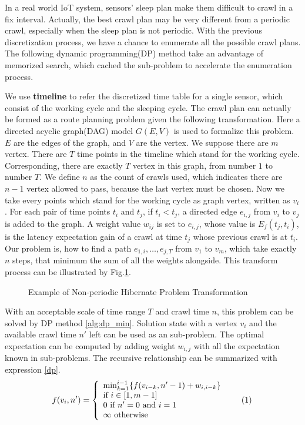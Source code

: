 \documentclass[conference]{IEEEtran}
\newcommand\numberthis{\addtocounter{equation}{1}\tag{\theequation}}
\begin{document}
In a real world IoT system, sensors' sleep plan make them difficult to crawl in a fix interval. 
Actually, the best crawl plan may be very different from a periodic crawl, especially when the sleep plan is not periodic.
With the previous discretization process, we have a chance to enumerate all the possible crawl plans. The following dynamic programming(DP) method take an advantage of memorized search, which cached the sub-problem to accelerate the enumeration process.

We use \textbf{timeline} to refer the discretized time table for a single sensor, which consist of the working cycle and the sleeping cycle.
The crawl plan can actually be formed as a route planning problem given the following transformation.
Here a directed acyclic graph(DAG) model $G(E,V)$ is used to formalize this problem.
$E$ are the edges of the graph, and $V$ are the vertex. We suppose there are $m$ vertex. 
There are $T$ time points in the timeline which stand for the working cycle. 
Corresponding, there are exactly $T$ vertex in this graph, from number $1$ to number $T$. 
We define $n$ as the count of crawls used, which indicates there are $n-1$ vertex allowed to pass, because the last vertex must be chosen. 
Now we take every points which stand for the working cycle as graph vertex, written as $v_i$. 
For each pair of time points $t_i$ and $t_j$, if $t_i<t_j$, a directed edge $e_{i,j}$ from $v_i$ to $v_j$ is added to the graph. 
A weight value $w_{ij}$ is set to $e_{i,j}$, whose value is $E_f(t_j, t_i)$, is the latency expectation gain of a crawl at time $t_j$ whose previous crawl is at $t_i$.
Our problem is, how to find a path $e_{1,i},\ldots,e_{j,T}$ from $v_1$ to $v_m$, which take exactly $n$ steps, that minimum the sum of all the weights alongside. 
This transform process can be illustrated by Fig.\ref{fig:problemtrans}.
\begin{figure}
	\centering
	
	\captionsetup{justification=centering}
	\caption{Example of Non-periodic Hibernate Problem Transformation}
	\label{fig:problemtrans}
\end{figure}

With an acceptable scale of time range $T$ and crawl time $n$, this problem can be solved by DP method \ref{alg:dp_min}. 
Solution state with a vertex $v_i$ and the available crawl time $n'$ left can be used as an sub-problem. 
The optimal expectation can be computed by adding weight $w_{i,j}$ with all the expectation known in sub-problems. 
The recursive relationship can be summarized with expression \eqref{dp}.
\[f(v_i, n')=\left\{
\begin{array}{lr}
\min_{k=1}^{i-1}\{f(v_{i-k}, n'-1)+w_{i,i-k}\}\\
\text{if }i\in[1, m-1]\\
0\text{ if }n'=0\text{ and }i=1\\
\infty\text{ otherwise}
\end{array}\numberthis \label{dp}
\right.
\]
\end{document}
